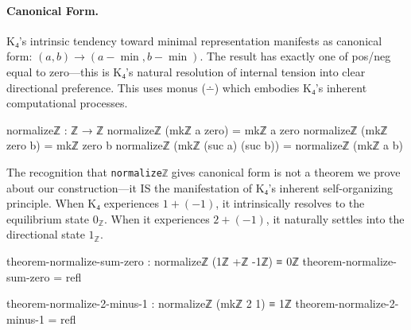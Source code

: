 \documentclass[11pt,a4paper]{book}
\begin{document}
\paragraph{Canonical Form.}
K₄'s intrinsic tendency toward minimal representation manifests as canonical form: $(a,b) \to (a-\min, b-\min)$. The result has exactly one of pos/neg equal to zero—this is K₄'s natural resolution of internal tension into clear directional preference. This uses monus ($\dotminus$) which embodies K₄'s inherent computational processes.

\begin{code}
normalizeℤ : ℤ → ℤ
normalizeℤ (mkℤ a       zero)    = mkℤ a zero
normalizeℤ (mkℤ zero    b)       = mkℤ zero b
normalizeℤ (mkℤ (suc a) (suc b)) = normalizeℤ (mkℤ a b)
\end{code}

The recognition that \texttt{normalizeℤ} gives canonical form is not a theorem we prove about our construction—it IS the manifestation of K₄'s inherent self-organizing principle. When K₄ experiences $1 + (-1)$, it intrinsically resolves to the equilibrium state $0_{\mathbb{Z}}$. When it experiences $2 + (-1)$, it naturally settles into the directional state $1_{\mathbb{Z}}$.

\begin{code}
theorem-normalize-sum-zero : normalizeℤ (1ℤ +ℤ -1ℤ) ≡ 0ℤ
theorem-normalize-sum-zero = refl

theorem-normalize-2-minus-1 : normalizeℤ (mkℤ 2 1) ≡ 1ℤ
theorem-normalize-2-minus-1 = refl
\end{code}
\end{document}
